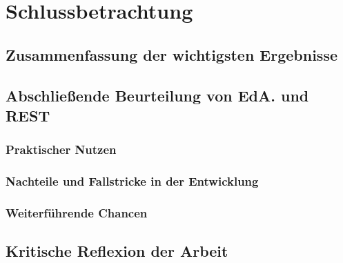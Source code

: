 \section{Schlussbetrachtung}
\subsection{Zusammenfassung der wichtigsten Ergebnisse}
\subsection{Abschließende Beurteilung von EdA. und REST}
\subsubsection{Praktischer Nutzen}
\subsubsection{Nachteile und Fallstricke in der Entwicklung}
\subsubsection{Weiterführende Chancen}
\subsection{Kritische Reflexion der Arbeit}
